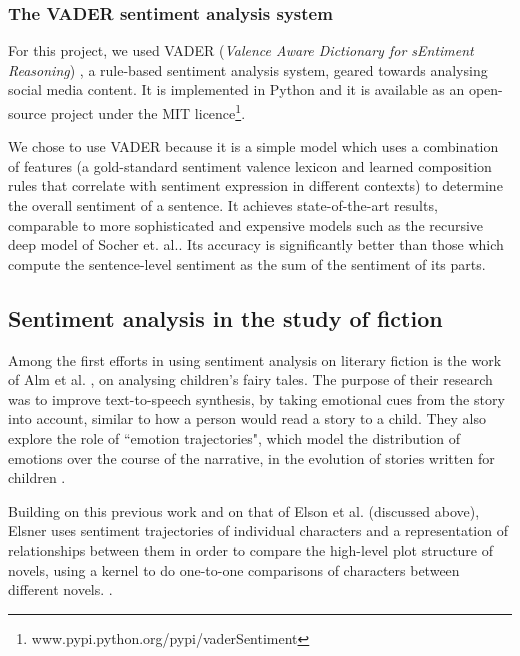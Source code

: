 \documentclass[bsc,frontabs,deptreport,singlespacing,parskip, twoside]{infthesis}
\begin{document}
\subsubsection{The VADER sentiment analysis system}

For this project, we used VADER (\textit{Valence Aware Dictionary for sEntiment Reasoning}) \cite{hutto2014vader}, a rule-based sentiment analysis system, geared towards analysing social media content. It is implemented in Python and it is available as an open-source project under the MIT licence\footnote{www.pypi.python.org/pypi/vaderSentiment}.

We chose to use VADER because it is a simple model which uses a combination of features (a gold-standard sentiment valence lexicon and learned composition rules that correlate with sentiment expression in different contexts) to determine the overall sentiment of a sentence. It achieves state-of-the-art results, comparable to more sophisticated and expensive models such as the recursive deep model of Socher et. al.\cite{socher2013recursive}. Its accuracy is significantly better than those which compute the sentence-level sentiment as the sum of the sentiment of its parts.


\subsection{Sentiment analysis in the study of fiction}
Among the first efforts in using sentiment analysis on literary fiction is the work of Alm et al. \cite{alm2005emotions}, on analysing children's fairy tales. The purpose of their research was to improve text-to-speech synthesis, by taking emotional cues from the story into account, similar to how a person would read a story to a child. They also explore the role of ``emotion trajectories", which model the distribution of emotions over the course of the narrative, in the evolution of stories written for children \cite{alm2005emotional}.

Building on this previous work and on that of Elson et al. \cite{Elson2010} (discussed above), Elsner uses sentiment trajectories of individual characters and a representation of relationships between them in order to compare the high-level plot structure of novels, using a kernel to do one-to-one comparisons of characters between different novels. \cite{elsner2012character}.
\end{document}
